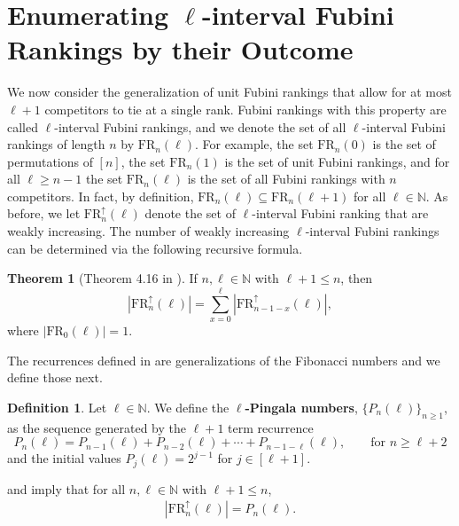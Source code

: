 \documentclass{amsart}
\newcommand{\defterm}{\textbf}
\theoremstyle{definition}
\newtheorem{theorem}{Theorem}[section]
\theoremstyle{definition}
\newtheorem{definition}{Definition}[section]
\theoremstyle{remark}
\newcommand{\NN}{\mathbb{N}}
\newcommand{\FR}[1]{\mathrm{FR}_{#1}}
\begin{document}
\section{Enumerating $\ell$-interval Fubini Rankings by their Outcome}\label{sec:ell FRs}
We now consider the generalization of unit Fubini rankings that allow for at most $\ell+1$
competitors to tie at a single rank.
Fubini rankings with this property are called $\ell$-interval
Fubini rankings, and we denote the set of all $\ell$-interval Fubini rankings of length $n$ by $\FR{n}(\ell)$. 
For example, the set $\FR{n}(0)$ is the set of permutations of $[n]$, the set $\FR{n}(1)$ is the set of unit Fubini rankings, and for all $\ell\geq n-1$ the set $\FR{n}(\ell)$ is the set of all Fubini rankings with $n$ competitors. 
In fact, by definition, 
$\FR{n}(\ell)\subseteq \FR{n}(\ell+1)$ for all $\ell\in\NN$.
As before, we let $\FR{n}^\uparrow(\ell)$ denote the set of $\ell$-interval
Fubini ranking that are weakly increasing. 
The number of  weakly increasing $\ell$-interval Fubini rankings can be determined via the following recursive formula.
 
\begin{theorem}[Theorem 4.16 in \cite{aguilarfraga2024interval}]\label{thm:recurrences for weakly increasing ell frs}
    If $n,\ell\in\NN$ with $\ell+1\leq n$, then 
    \begin{equation}   \left|\FR{n}^\uparrow(\ell)\right| = \sum_{x=0}^\ell \left|\FR{n-1-x}^\uparrow(\ell)\right|, \label{eq: count for weakly increasing Fubini}
    \end{equation}
    where $\left|\FR{0}(\ell)\right|=1$.
\end{theorem}

The recurrences defined in  are generalizations of the Fibonacci numbers and we define those next.

\begin{definition}\label{def:ell-Pingala}
    Let $\ell\in \NN$. We define the \defterm{$\ell$-Pingala numbers}, $\{P_{n}(\ell)\}_{n\geq 1}$, as the sequence generated by the $\ell+1$ term recurrence
    \[P_n(\ell)=P_{n-1}(\ell)+P_{n-2}(\ell)+\cdots +P_{n-1-\ell}(\ell),\qquad \mbox{for $n\geq \ell+2$}\]
and the initial values $P_j(\ell)=2^{j-1}$ for $j\in[\ell+1]$.
\end{definition}

 and  imply that for all $n,\ell\in\NN$ with $\ell+1\leq n$,  
\begin{align}
|\FR{n}^\uparrow(\ell)|=P_n(\ell).\label{eq:pingala count}
\end{align}
\end{document}
